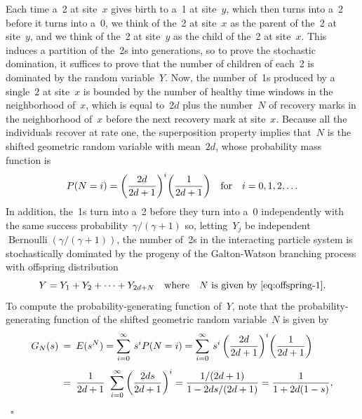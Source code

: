 \documentclass[letterpaper,11pt,twoside,keywordsasfootnote,addressatend,noinfoline]{article}
\newenvironment{proof}{\noindent{\bf Proof.}}{\hspace*{2mm}~$\square$}
\newcommand{\n}{\hspace*{-5pt}}
\DeclareMathOperator{\bernoulli}{Bernoulli}
\begin{document}
\begin{proof}
 Each time a~2 at site~$x$ gives birth to a~1 at site~$y$, which then turns into a~2 before it turns into a~0, we think of the~2 at site~$x$ as the parent of the~2 at site~$y$, and we think of the~2 at site~$y$ as the child of the~2 at site~$x$.
 This induces a partition of the~2s into generations, so to prove the stochastic domination, it suffices to prove that the number of children of each~2 is dominated by the random variable~$Y$.
 Now, the number of~1s produced by a single~2 at site~$x$ is bounded by the number of healthy time windows in the neighborhood of~$x$, which is equal to~$2d$ plus the number~$N$ of recovery marks in the neighborhood of~$x$ before the next recovery mark at site~$x$.
 Because all the individuals recover at rate one, the superposition property implies that~$N$ is the shifted geometric random variable with mean~$2d$, whose probability mass function is
\begin{equation}
\label{eq:offspring-1}
  P (N = i) = \bigg(\frac{2d}{2d + 1} \bigg)^i \bigg(\frac{1}{2d + 1} \bigg) \quad \hbox{for} \quad i = 0, 1, 2, \ldots
\end{equation}
 In addition, the~1s turn into a~2 before they turn into a~0 independently with the same success probability~$\gamma / (\gamma + 1)$ so, letting~$Y_j$ be independent~$\bernoulli (\gamma / (\gamma + 1))$, the number of~2s in the interacting particle system is stochastically dominated by the progeny of the Galton-Watson branching process with offspring distribution
\begin{equation}
\label{eq:offspring-2}
  Y = Y_1 + Y_2 + \cdots + Y_{2d + N} \quad \hbox{where} \quad N \ \hbox{is given by~\eqref{eq:offspring-1}}.
\end{equation}
 To compute the probability-generating function of~$Y$, note that the probability-generating function of the shifted geometric random variable~$N$ is given by
\begin{equation}
\label{eq:offspring-3}
\begin{array}{rcl}
\displaystyle G_N (s) & \n = \n &
\displaystyle E (s^N) = \sum_{i = 0}^{\infty} \,s^i P (N = i) = \sum_{i = 0}^{\infty} \,s^i \,\bigg(\frac{2d}{2d + 1} \bigg)^i \bigg(\frac{1}{2d + 1} \bigg) \vspace*{8pt} \\ & \n = \n &
\displaystyle \frac{1}{2d + 1} \ \sum_{i = 0}^{\infty} \bigg(\frac{2ds}{2d + 1} \bigg)^i = \frac{1 / (2d + 1)}{1 - 2ds / (2d + 1)} = \frac{1}{1 + 2d (1 - s)}, \end{array}

\end{equation}
\end{proof}
\end{document}

